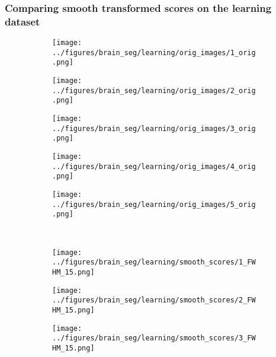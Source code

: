 \newpage
\subsubsection{Comparing smooth transformed scores on the learning dataset}\label{brainsmooth}

\begin{figure}[h!] %
	\centering
	\begin{subfigure}{0.16\textwidth}
		\centering
		\texttt{[image: ../figures/brain\_seg/learning/orig\_images/1\_orig.png]}
		\label{fig:1}
	\end{subfigure}
	\begin{subfigure}{0.16\textwidth}
		\centering
		\texttt{[image: ../figures/brain\_seg/learning/orig\_images/2\_orig.png]}
		\label{fig:2}
	\end{subfigure}
	\begin{subfigure}{0.16\textwidth}
		\centering
		\texttt{[image: ../figures/brain\_seg/learning/orig\_images/3\_orig.png]}
		\label{fig:3}
	\end{subfigure}
	\begin{subfigure}{0.16\textwidth}
		\centering
		\texttt{[image: ../figures/brain\_seg/learning/orig\_images/4\_orig.png]}
		\label{fig:4}
	\end{subfigure}
	\begin{subfigure}{0.16\textwidth}
		\centering
		\texttt{[image: ../figures/brain\_seg/learning/orig\_images/5\_orig.png]}
		\label{fig:5}
	\end{subfigure}
	\\
	\vspace{-0.35cm}
	\begin{subfigure}{0.16\textwidth}
		\centering
		\texttt{[image: ../figures/brain\_seg/learning/smooth\_scores/1\_FWHM\_15.png]}
		\label{fig:6}
	\end{subfigure}
	\begin{subfigure}{0.16\textwidth}
		\centering
		\texttt{[image: ../figures/brain\_seg/learning/smooth\_scores/2\_FWHM\_15.png]}
		\label{fig:7}
	\end{subfigure}
	\begin{subfigure}{0.16\textwidth}
		\centering
		\texttt{[image: ../figures/brain\_seg/learning/smooth\_scores/3\_FWHM\_15.png]}

\end{subfigure}
\end{figure}

